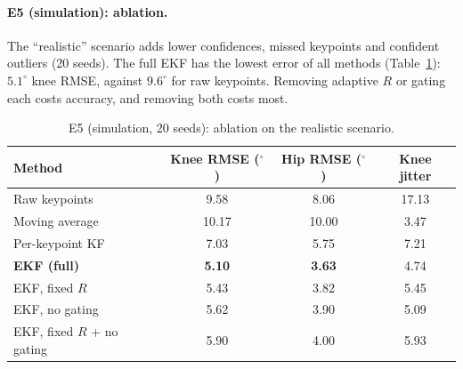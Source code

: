 \documentclass[12pt,a4paper]{article}
\begin{document}
\begin{table}[H]
\centering\small
\caption{E4: mean knee error ($^\circ$) during the gap and over the 20 frames after it.}
\label{tab:e4}
\end{table}

\paragraph{E5 (simulation): ablation.} The ``realistic'' scenario adds lower confidences, missed
keypoints and confident outliers (20 seeds). The full EKF has the lowest error of all methods
(Table~\ref{tab:e5sim}): $5.1^\circ$ knee RMSE, against $9.6^\circ$ for raw keypoints. Removing adaptive $R$
or gating each costs accuracy, and removing both costs most.

\begin{table}[H]
\centering\small
\caption{E5 (simulation, 20 seeds): ablation on the realistic scenario.}
\label{tab:e5sim}
\begin{tabular}{lccc}
\toprule
Method & Knee RMSE ($^\circ$) & Hip RMSE ($^\circ$) & Knee jitter\\
\midrule
Raw keypoints              & 9.58 & 8.06 & 17.13\\
Moving average             & 10.17 & 10.00 & 3.47\\
Per-keypoint KF            & 7.03 & 5.75 & 7.21\\
\textbf{EKF (full)}        & \textbf{5.10} & \textbf{3.63} & 4.74\\
EKF, fixed $R$             & 5.43 & 3.82 & 5.45\\
EKF, no gating             & 5.62 & 3.90 & 5.09\\
EKF, fixed $R$ + no gating & 5.90 & 4.00 & 5.93\\
\bottomrule
\end{tabular}
\end{table}
\end{document}
